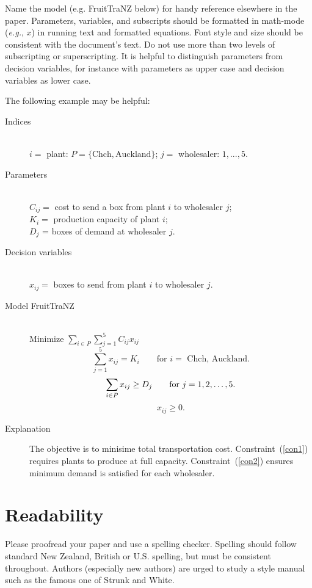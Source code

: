 \documentclass[12pt]{ORSNZ}
\begin{document}
Name the model (e.g. FruitTraNZ below) for handy reference elsewhere in
the paper. Parameters, variables, and subscripts should be formatted in
math-mode (\emph{e.g.}, $x$) in running text and formatted equations.
Font style and size should be consistent with the document's text. Do
not use more than two levels of subscripting or superscripting. It is
helpful to distinguish parameters from decision variables, for instance
with parameters as upper case and decision variables as lower case.

The following example may be helpful:

\begin{description}
\item[Indices] \mbox{}\\
        $i =$ plant: $P=\{\mbox{Chch}, \mbox{Auckland}\}$;
        $j =$ wholesaler: $1,..., 5$.
\item[Parameters] \mbox{} \\
$C_{ij} = $ cost to send a box from plant $i$ to wholesaler $j$; \\
$K_i = $ production capacity of plant $i$; \\
$D_j$ = boxes of demand at wholesaler $j$.

\item[Decision variables]\mbox{} \\
$x_{ij} = $ boxes to send from plant $i$ to wholesaler $j$.

\item[Model FruitTraNZ]\mbox{} \\
Minimize \quad $\sum_{i \in P}\sum_{j=1}^5 C_{ij}x_{ij}$
\begin{equation} \label{con1}
\sum_{j=1}^5 x_{ij} =  K_i \qquad \mbox{for $i = $ Chch, Auckland.}
\end{equation}
\begin{equation} \label{con2}
\sum_{i \in P} x_{ij} \geq D_j \qquad \mbox{for $ j = 1, 2, \ldots, 5$.}
\end{equation}
\[x_{ij} \geq 0.\]

\item[Explanation] The objective is to minisime total transportation
cost. Constraint~(\ref{con1}) requires plants to produce at full
capacity. Constraint~(\ref{con2}) ensures minimum demand is satisfied
for each wholesaler.
\end{description}

\section{Readability}
Please proofread your paper and use a spelling checker. Spelling should
follow standard New Zealand, British or U.S. spelling, but must be
consistent throughout. Authors (especially new authors) are urged to
study a style manual such as the famous one of Strunk and White.
\end{document}
